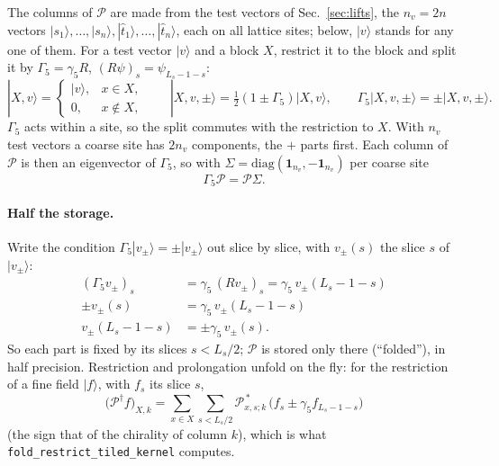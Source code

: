 \documentclass[11pt,a4paper]{article}
\numberwithin{equation}{section}
\newcommand{\dg}{^{\dagger}}
\newcommand{\Gfive}{\Gamma_5}
\newcommand{\Pro}{\mathcal P}
\newcommand{\code}[1]{\texttt{\small #1}}
\begin{document}
The columns of $\Pro$ are made from the test vectors of Sec.~\ref{sec:lifts}, the
$n_v=2n$ vectors $|s_1\rangle,\dots,|s_n\rangle,|\hat t_1\rangle,\dots,|\hat t_n\rangle$, each on
all lattice sites; below, $|v\rangle$ stands for any one of them. For a test vector $|v\rangle$ and a block $X$, restrict it to the block and split it
by $\Gfive=\gamma_5R$, $(R\psi)_s=\psi_{L_s-1-s}$:
\begin{equation}
|X,v\rangle=\begin{cases}|v\rangle, & x\in X,\\ 0, & x\notin X,\end{cases}\qquad
|X,v,\pm\rangle=\tfrac12(1\pm\Gfive)|X,v\rangle,\qquad \Gfive|X,v,\pm\rangle=\pm|X,v,\pm\rangle .
\end{equation}
$\Gfive$ acts within a site, so the split commutes with the restriction to $X$.
With $n_v$ test vectors a coarse site has $2n_v$ components, the $+$ parts first. Each column of
$\Pro$ is then an eigenvector of $\Gfive$, so with $\Sigma=\mathrm{diag}(\mathbf 1_{n_v},-\mathbf
1_{n_v})$ per coarse site
\begin{equation}
\Gfive\Pro=\Pro\Sigma .
\end{equation}
\paragraph{Half the storage.} Write the condition $\Gfive|v_\pm\rangle=\pm|v_\pm\rangle$ out slice by
slice, with $v_\pm(s)$ the slice $s$ of $|v_\pm\rangle$:
\begin{align}
(\Gfive v_\pm)_s&=\gamma_5\,(Rv_\pm)_s=\gamma_5\,v_\pm(L_s-1-s)\nonumber\\
\pm v_\pm(s)&=\gamma_5\,v_\pm(L_s-1-s)\nonumber\\
v_\pm(L_s-1-s)&=\pm\gamma_5\,v_\pm(s) .
\end{align}
So each part is fixed by its slices $s<L_s/2$; $\Pro$ is stored only there (``folded''), in half
precision. Restriction and prolongation unfold on the fly: for the restriction of a fine field
$|f\rangle$, with $f_s$ its slice $s$,
\begin{equation}
\big(\Pro\dg f\big)_{X,k}=\sum_{x\in X}\sum_{s<L_s/2}\Pro_{x,s;k}^{\,*}\,
\big(f_s\pm\gamma_5f_{L_s-1-s}\big)
\end{equation}
(the sign that of the chirality of column $k$), which is what \code{fold\_restrict\_tiled\_kernel}
computes.
\end{document}
